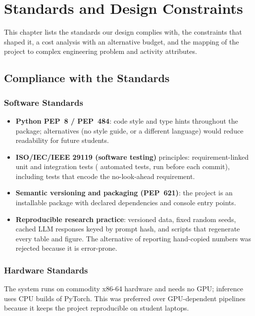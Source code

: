 \chapter{Standards and Design Constraints}
\label{ch:sic}

This chapter lists the standards our design complies with, the constraints that shaped it, a cost analysis with an alternative budget, and the mapping of the project to complex engineering problem and activity attributes.

\section{Compliance with the Standards}

\subsection{Software Standards}
\begin{itemize}
  \item \textbf{Python PEP~8 / PEP~484}: code style and type hints throughout the package; alternatives (no style guide, or a different language) would reduce readability for future students.
  \item \textbf{ISO/IEC/IEEE 29119 (software testing)} principles: requirement-linked unit and integration tests (\testcount{} automated tests, run before each commit), including tests that encode the no-look-ahead requirement.
  \item \textbf{Semantic versioning and packaging (PEP~621)}: the project is an installable package with declared dependencies and console entry points.
  \item \textbf{Reproducible research practice}: versioned data, fixed random seeds, cached LLM responses keyed by prompt hash, and scripts that regenerate every table and figure. The alternative of reporting hand-copied numbers was rejected because it is error-prone.
\end{itemize}

\subsection{Hardware Standards}
The system runs on commodity x86-64 hardware and needs no GPU; inference uses CPU builds of PyTorch. This was preferred over GPU-dependent pipelines because it keeps the project reproducible on student laptops.

